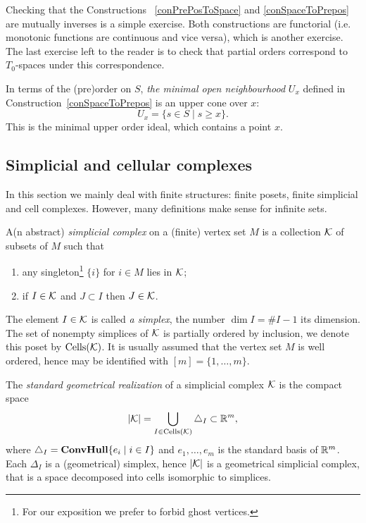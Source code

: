 Checking that the Constructions ~\ref{conPrePosToSpace} and \ref{conSpaceToPrepos} are mutually inverses is a simple exercise. Both constructions are functorial (i.e. monotonic functions are continuous and vice versa), which is another exercise. The last exercise left to the reader is to check that partial orders correspond to $T_0$-spaces under this correspondence.

\begin{rem}\label{remMinNbhdIsACone}
In terms of the (pre)order on $S$, \emph{the minimal open neighbourhood} $U_x$ defined in Construction~\ref{conSpaceToPrepos} is an upper cone over $x$:
\[
U_x=\{s\in S\mid s\geq x\}.
\]
This is the minimal upper order ideal, which contains a point $x$.
\end{rem}

\subsection{Simplicial and cellular complexes}

In this section we mainly deal with finite structures: finite posets, finite simplicial and cell complexes. However, many definitions make sense for infinite sets.

\begin{defin}\label{definSimpComp}
A(n abstract) \emph{simplicial complex} on a (finite) vertex set $M$ is a collection $\mathcal{K}$ of subsets of $M$ such that
\begin{enumerate}
  \item any singleton\footnote{For our exposition we prefer to forbid ghost vertices.} $\{i\}$ for $i\in M$ lies in $\mathcal{K}$;
  \item if $I\in \mathcal{K}$ and $J\subset I$ then $J\in \mathcal{K}$.
\end{enumerate}
\end{defin}

The element $I\in \mathcal{K}$ is called \emph{a simplex}, the number $\dim I=\#I-1$ its dimension. The set of nonempty simplices of $\mathcal{K}$ is partially ordered by inclusion, we denote this poset by $\operatorname{Cells}(\mathcal{K})$. It is usually assumed that the vertex set $M$ is well ordered, hence may be identified with $[m]=\{1,\ldots,m\}$.

\begin{con}\label{conStandardGeomRealization}
The \emph{standard geometrical realization} of a simplicial complex $\mathcal{K}$ is the compact space
\begin{equation}\label{eqStdGeomRealiz}
|\mathcal{K}|=\bigcup_{I\in \operatorname{Cells}(\mathcal{K})}\triangle_I\subset\mathbb{R}^m,
\end{equation}
where $\triangle_I=\operatorname{\mathbf{ConvHull}}\{e_i\mid i\in I\}$ and $e_1,\ldots,e_m$ is the standard basis of $\mathbb{R}^m$. Each $\Delta_I$ is a (geometrical) simplex, hence $|\mathcal{K}|$ is a geometrical simplicial complex, that is a space decomposed into cells isomorphic to simplices.
\end{con}

